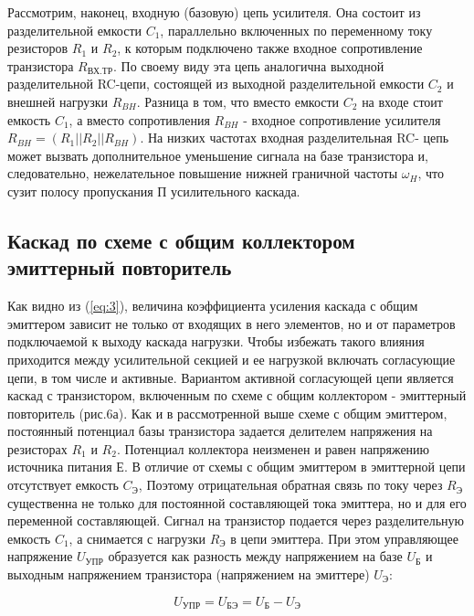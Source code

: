 Рассмотрим, наконец, входную (базовую) цепь усилителя. Она состоит из разделительной емкости $C_1$, параллельно включенных по переменному току резисторов $R_1$ и $R_2$, к которым подключено также входное сопротивление транзистора $R_{\text{ВХ.ТР}}$. По своему виду эта цепь аналогична выходной разделительной RC-цепи, состоящей из выходной разделительной емкости $C_2$ и внешней нагрузки $R_{BH}$. Разница в том, что вместо емкости $C_2$ на входе стоит емкость $C_1$, а вместо сопротивления $R_{BH}$ - входное сопротивление усилителя $R_{BH}= (R_1||R_2||R_{BH})$. На низких частотах входная разделительная RC- цепь может вызвать дополнительное уменьшение сигнала на базе
транзистора и, следовательно, нежелательное повышение нижней граничной частоты $\omega_H$, что сузит полосу пропускания П усилительного каскада.

\subsection{\textbf{Каскад по схеме с общим коллектором эмиттерный повторитель}}
Как видно из (\ref{eq:3}), величина коэффициента усиления каскада с общим эмиттером зависит не только от входящих в него элементов, но и от параметров подключаемой к выходу каскада нагрузки. Чтобы избежать такого влияния приходится между усилительной секцией и ее нагрузкой включать согласующие цепи, в том числе и активные. Вариантом активной согласующей цепи является каскад с транзистором, включенным по схеме с общим коллектором - эмиттерный повторитель (рис.6а). Как и в рассмотренной выше схеме с общим эмиттером, постоянный потенциал базы транзистора задается делителем напряжения на резисторах $R_1$ и $R_2$. Потенциал коллектора неизменен и равен напряжению источника питания Е. В отличие от схемы с общим эмиттером в эмиттерной цепи отсутствует емкость $C_{\text{Э}}$, Поэтому отрицательная обратная связь по току через $R_{\text{Э}}$ существенна не только для постоянной составляющей тока эмиттера, но и для его переменной составляющей. Сигнал на транзистор подается через разделительную емкость $C_1$, а снимается с нагрузки $R_{\text{Э}}$ в цепи эмиттера. При этом управляющее напряжение $U_{\text{УПР}}$ образуется как разность между напряжением на базе $U_{\text{Б}}$ и выходным напряжением транзистора (напряжением на эмиттере) $U_{\text{Э}}$:

\begin{equation}
	U_{\text{УПР}}=U_{\text{БЭ}}=U_{\text{Б}}-U_{\text{Э}}
	\label{eq:4}
\end{equation}

